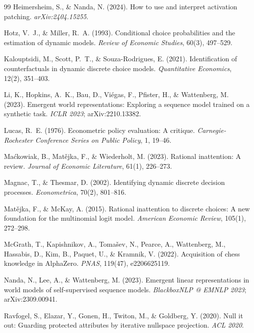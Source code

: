 \documentclass[11pt]{article}
\begin{document}
\begin{thebibliography}{99}
Heimersheim, S., \& Nanda, N. (2024). How to use and interpret activation
patching. \emph{arXiv:2404.15255}.

Hotz, V.~J., \& Miller, R.~A. (1993). Conditional choice probabilities and
the estimation of dynamic models. \emph{Review of Economic Studies}, 60(3),
497--529.

Kalouptsidi, M., Scott, P.~T., \& Souza-Rodrigues, E. (2021).
Identification of counterfactuals in dynamic discrete choice models.
\emph{Quantitative Economics}, 12(2), 351--403.

Li, K., Hopkins, A.~K., Bau, D., Vi\'egas, F., Pfister, H., \& Wattenberg,
M. (2023). Emergent world representations: Exploring a sequence model
trained on a synthetic task. \emph{ICLR 2023}; arXiv:2210.13382.

Lucas, R.~E. (1976). Econometric policy evaluation: A critique.
\emph{Carnegie-Rochester Conference Series on Public Policy}, 1, 19--46.

Ma\'ckowiak, B., Mat\v{e}jka, F., \& Wiederholt, M. (2023). Rational
inattention: A review. \emph{Journal of Economic Literature}, 61(1),
226--273.

Magnac, T., \& Thesmar, D. (2002). Identifying dynamic discrete decision
processes. \emph{Econometrica}, 70(2), 801--816.

Mat\v{e}jka, F., \& McKay, A. (2015). Rational inattention to discrete
choices: A new foundation for the multinomial logit model. \emph{American
Economic Review}, 105(1), 272--298.

McGrath, T., Kapishnikov, A., Toma\v{s}ev, N., Pearce, A., Wattenberg, M.,
Hassabis, D., Kim, B., Paquet, U., \& Kramnik, V. (2022). Acquisition of
chess knowledge in AlphaZero. \emph{PNAS}, 119(47), e2206625119.

Nanda, N., Lee, A., \& Wattenberg, M. (2023). Emergent linear
representations in world models of self-supervised sequence models.
\emph{BlackboxNLP @ EMNLP 2023}; arXiv:2309.00941.

Ravfogel, S., Elazar, Y., Gonen, H., Twiton, M., \& Goldberg, Y. (2020).
Null it out: Guarding protected attributes by iterative nullspace
projection. \emph{ACL 2020}.


\end{thebibliography}
\end{document}
